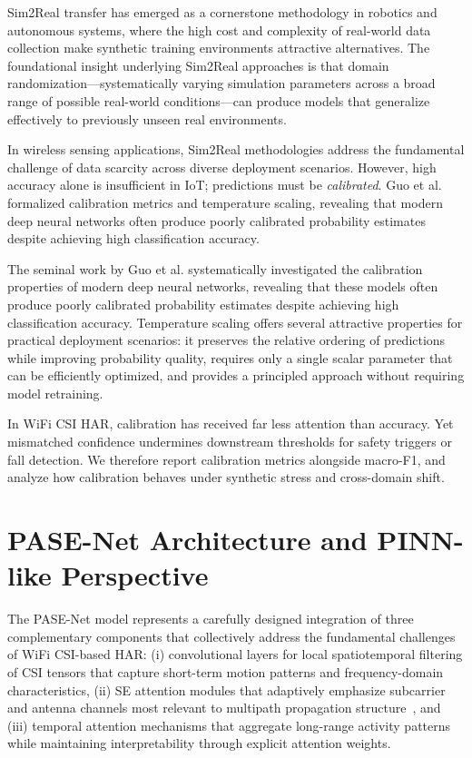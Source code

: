 \documentclass[lettersize,journal]{IEEEtran}
\begin{document}
Sim2Real transfer has emerged as a cornerstone methodology in robotics and autonomous systems, where the high cost and complexity of real-world data collection make synthetic training environments attractive alternatives. The foundational insight underlying Sim2Real approaches is that domain randomization—systematically varying simulation parameters across a broad range of possible real-world conditions—can produce models that generalize effectively to previously unseen real environments.

In wireless sensing applications, Sim2Real methodologies address the fundamental challenge of data scarcity across diverse deployment scenarios. However, high accuracy alone is insufficient in IoT; predictions must be \emph{calibrated}. Guo et al.~\cite{calibration_guo2017} formalized calibration metrics and temperature scaling, revealing that modern deep neural networks often produce poorly calibrated probability estimates despite achieving high classification accuracy.

The seminal work by Guo et al. systematically investigated the calibration properties of modern deep neural networks, revealing that these models often produce poorly calibrated probability estimates despite achieving high classification accuracy. Temperature scaling offers several attractive properties for practical deployment scenarios: it preserves the relative ordering of predictions while improving probability quality, requires only a single scalar parameter that can be efficiently optimized, and provides a principled approach without requiring model retraining.

In WiFi CSI HAR, calibration has received far less attention than accuracy. Yet mismatched confidence undermines downstream thresholds for safety triggers or fall detection. We therefore report calibration metrics alongside macro-F1, and analyze how calibration behaves under synthetic stress and cross-domain shift.

\section{PASE-Net Architecture and PINN-like Perspective}

The PASE-Net model represents a carefully designed integration of three complementary components that collectively address the fundamental challenges of WiFi CSI-based HAR: (i) convolutional layers for local spatiotemporal filtering of CSI tensors that capture short-term motion patterns and frequency-domain characteristics, (ii) SE attention modules that adaptively emphasize subcarrier and antenna channels most relevant to multipath propagation structure~\cite{se_networks2018}, and (iii) temporal attention mechanisms that aggregate long-range activity patterns while maintaining interpretability through explicit attention weights.
\end{document}
